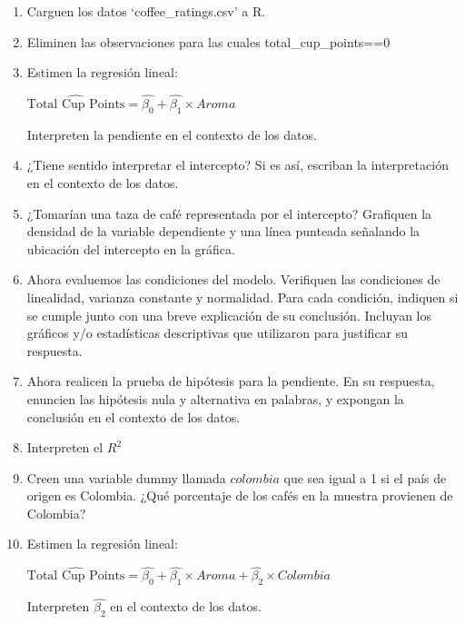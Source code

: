 \documentclass[letterpaper]{article}
\begin{document}
\begin{enumerate}

\item Carguen los datos `coffee\_ratings.csv' a R.

\item Eliminen las observaciones para las cuales total\_cup\_points==0



\item Estimen la regresión lineal:

 $\widehat{\text{Total Cup Points}}=\hat{\beta_0}+\hat{\beta_1}\times Aroma$
 
 Interpreten la pendiente en el contexto de los datos.
 
 \item ¿Tiene sentido interpretar el intercepto? Si es así, escriban la interpretación en el contexto de los datos.
 
 \item ¿Tomarían una taza de café representada por el intercepto? Grafiquen la densidad de la variable dependiente y una línea punteada señalando la ubicación del intercepto en la gráfica.
 
 \item Ahora evaluemos las condiciones del modelo. Verifiquen las condiciones de linealidad, varianza constante y normalidad. Para cada condición, indiquen si se cumple junto con una breve explicación de su conclusión. Incluyan los gráficos y/o estadísticas descriptivas que utilizaron para justificar su respuesta.
 
 
 \item Ahora realicen la prueba de hipótesis para la pendiente. En su respuesta, enuncien las hipótesis nula y alternativa en palabras, y expongan la conclusión en el contexto de los datos.
 
 \item Interpreten el $R^2$
 
 \item Creen una variable dummy llamada $colombia$ que sea igual a 1 si el país de origen es Colombia. ¿Qué porcentaje de los cafés en la muestra provienen de Colombia?
 
 \item Estimen la regresión lineal:
 
 
 $\widehat{\text{Total Cup Points}}=\hat{\beta_0}+\hat{\beta_1}\times Aroma + \hat{\beta_2}\times Colombia$
 
 Interpreten $\hat{\beta_2}$ en el contexto de los datos.
 

\end{enumerate}
\end{document}
